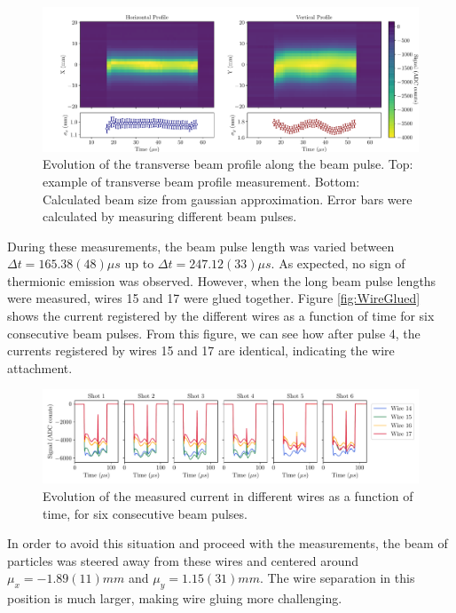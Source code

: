 \begin{figure}[h]
    \centering
    \includegraphics[width=1.0\columnwidth]{Figure_BeamProfileStudy/BeamProfEvol1.pdf}
    \caption{Evolution of the transverse beam profile along the beam pulse. Top: example of transverse beam profile measurement. Bottom: Calculated beam size from gaussian approximation. Error bars were calculated by measuring different beam pulses.  }
    \label{fig:PulseEvol}
\end{figure}

During these measurements, the beam pulse length was varied between $\Delta t = 165.38(48) \mu s$ up to $\Delta t = 247.12(33) \mu s$. As expected, no sign of thermionic emission was observed. However, when the long beam pulse lengths were measured, wires 15 and 17 were glued together. Figure \ref{fig:WireGlued} shows the current registered by the different wires as a function of time for six consecutive beam pulses. From this figure, we can see how after pulse 4, the currents registered by wires 15 and 17 are identical, indicating the wire attachment. 

\begin{figure}[h]
    \centering
    \includegraphics[width=1.0\columnwidth]{Figure_WiresGluing/WireWithTime.pdf}
    \caption{Evolution of the measured current in different wires as a function of time, for six consecutive beam pulses. }
    \label{fig:PulseEvol}
\end{figure}

In order to avoid this situation and proceed with the measurements, the beam of particles was steered away from these wires and centered around $\mu_x = -1.89(11) mm$ and $\mu_y = 1.15(31) mm$. The wire separation in this position is much larger, making wire gluing more challenging. 

